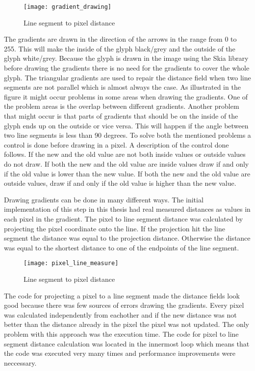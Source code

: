 \begin{figure}[H]
\texttt{[image: gradient\_drawing]}
\caption{Line segment to pixel distance}
\label{fig:grad}
\end{figure}

The gradients are drawn in the direction of the arrows in the range from 0 to 255. This will make the inside of the glyph black/grey and the outside of the glyph white/grey. Because the glyph is drawn in the image using the Skia library before drawing the gradients there is no need for the gradients to cover the whole glyph. The triangular gradients are used to repair the distance field when two line segments are not parallel which is almost always the case. As illustrated in the figure it might occur problems in some areas when drawing the gradients. One of the problem areas is the overlap between different gradients. Another problem that might occur is that parts of gradients that should be on the inside of the glyph ends up on the outside or vice versa. This will happen if the angle between two line segments is less than 90 degrees. To solve both the mentioned problems a control is done before drawing in a pixel. A description of the control done follows. If the new and the old value are not both inside values or outside values do not draw. If both the new and the old value are inside values draw if and only if the old value is lower than the new value. If both the new and the old value are outside values, draw if and only if the old value is higher than the new value.

Drawing gradients can be done in many different ways. The initial implementation of this step in this thesis had real measured distances as values in each pixel in the gradient. The pixel to line segment distance was calculated by projecting the pixel coordinate onto the line. If the projection hit the line segment the distance was equal to the projection distance. Otherwise the distance was equal to the shortest distance to one of the endpoints of the line segment.

\begin{figure}[H]
\texttt{[image: pixel\_line\_measure]}
\caption{Line segment to pixel distance}
\end{figure}

The code for projecting a pixel to a line segment made the distance fields look good because there was few sources of errors drawing the gradients. Every pixel was calculated independently from eachother and if the new distance was not better than the distance already in the pixel the pixel was not updated. The only problem with this approach was the execution time. The code for pixel to line segment distance calculation was located in the innermost loop which means that the code was executed very many times and performance improvements were neccessary.

